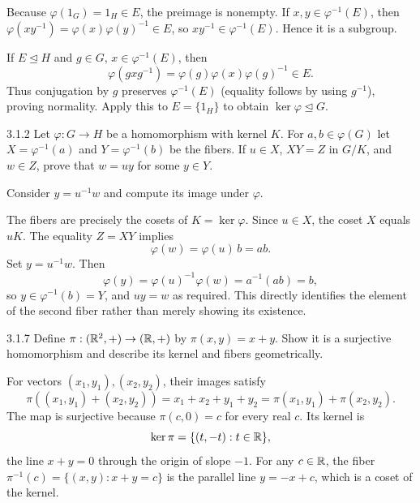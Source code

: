 \documentclass[11pt,oneside]{article}
\begin{document}
\begin{solution}
Because $\varphi(1_G)=1_H\in E$, the preimage is nonempty. If $x,y\in\varphi^{-1}(E)$, then $\varphi(xy^{-1})=\varphi(x)\varphi(y)^{-1}\in E$, so $xy^{-1}\in\varphi^{-1}(E)$. Hence it is a subgroup.

If $E\trianglelefteq H$ and $g\in G$, $x\in\varphi^{-1}(E)$, then
\[
\varphi(gxg^{-1})=\varphi(g)\varphi(x)\varphi(g)^{-1}\in E.
\]
Thus conjugation by $g$ preserves $\varphi^{-1}(E)$ (equality follows by using $g^{-1}$), proving normality. Apply this to $E=\{1_H\}$ to obtain $\ker\varphi\trianglelefteq G$.
\end{solution}

\begin{exercise}{3.1.2}
Let $\varphi:G\to H$ be a homomorphism with kernel $K$. For $a,b\in\varphi(G)$ let $X=\varphi^{-1}(a)$ and $Y=\varphi^{-1}(b)$ be the fibers. If $u\in X$, $XY=Z$ in $G/K$, and $w\in Z$, prove that $w=uy$ for some $y\in Y$.
\end{exercise}

\begin{hint}
Consider $y=u^{-1}w$ and compute its image under $\varphi$.
\end{hint}

\begin{solution}
The fibers are precisely the cosets of $K=\ker\varphi$. Since $u\in X$, the coset $X$ equals $uK$. The equality $Z=XY$ implies
\[
 \varphi(w)=\varphi(u)\,b=ab.
\]
Set $y=u^{-1}w$. Then
\[
 \varphi(y)=\varphi(u)^{-1}\varphi(w)=a^{-1}(ab)=b,
\]
so $y\in\varphi^{-1}(b)=Y$, and $uy=w$ as required. This directly identifies the element of the second fiber rather than merely showing its existence.
\end{solution}

\begin{exercise}{3.1.7}
Define $\pi:(\mathbb{R}^2,+)\to(\mathbb{R},+)$ by $\pi(x,y)=x+y$. Show it is a surjective homomorphism and describe its kernel and fibers geometrically.
\end{exercise}

\begin{solution}
For vectors $(x_1,y_1),(x_2,y_2)$, their images satisfy
\[
\pi((x_1,y_1)+(x_2,y_2))=x_1+x_2+y_1+y_2=\pi(x_1,y_1)+\pi(x_2,y_2).
\]
The map is surjective because $\pi(c,0)=c$ for every real $c$. Its kernel is
\[
\ker\pi=\{(t,-t):t\in\mathbb{R}\},
\]
the line $x+y=0$ through the origin of slope $-1$. For any $c\in\mathbb{R}$, the fiber $\pi^{-1}(c)=\{(x,y):x+y=c\}$ is the parallel line $y=-x+c$, which is a coset of the kernel.
\end{solution}
\end{document}

